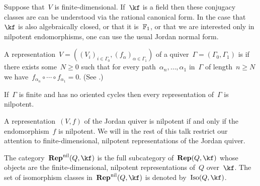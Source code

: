 \documentclass[a4paper,11pt]{scrartcl}
\begin{document}
Suppose that~$V$ is finite-dimensional.
If~$\kf$ is a field then these conjugacy classes are can be understood via the rational canonical form.
In the case that~$\kf$ is also algebraically closed, or that it is~$\mathbb{F}_1$, or that we are interested only in nilpotent endomorphisms, one can use the usual Jordan normal form.

\begin{recall}
  A representation~$V = ((V_i)_{i \in \Gamma_0}, (f_\alpha)_{\alpha \in \Gamma_1})$ of a quiver~$\Gamma = (\Gamma_0, \Gamma_1)$ is  if there exists some~$N \geq 0$ such that for every path~$\alpha_n, \dotsc, \alpha_1$ in~$\Gamma$ of length~$n \geq N$ we have~$f_{\alpha_n} \circ \dotsb \circ f_{\alpha_1} = 0$.
  (See \cite[Definition~4.4]{quiver_reps_F1}.)

  If~$\Gamma$ is finite and has no oriented cycles then every representation of~$\Gamma$ is nilpotent.
\end{recall}

A representation~$(V, f)$ of the Jordan quiver is nilpotent if and only if the endomorphism~$f$ is nilpotent.
We will in the rest of this talk restrict our attention to finite-dimensional, nilpotent representations of the Jordan quiver.

\begin{definition}
  The category~$\Repnil(Q, \kf)$ is the full subcategory of~$\Rep(Q, \kf)$ whose objects are the finite-dimensional, nilpotent representations of~$Q$ over~$\kf$.
  The set of isomorphism classes in~$\Repnil(Q, \kf)$ is denoted by~$\Iso(Q, \kf)$.
\end{definition}
\end{document}

